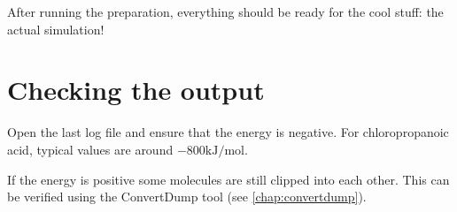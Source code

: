 
After running the preparation, everything should be ready for the cool stuff: 
the actual simulation!

\section{Checking the output}
Open the last log file and ensure that the energy is negative. For 
chloropropanoic acid, typical values are around $-800 \textrm{kJ/mol}$.

If the energy is positive some molecules are still clipped into each other. 
This can be verified using the ConvertDump tool (see \ref{chap:convertdump}).

